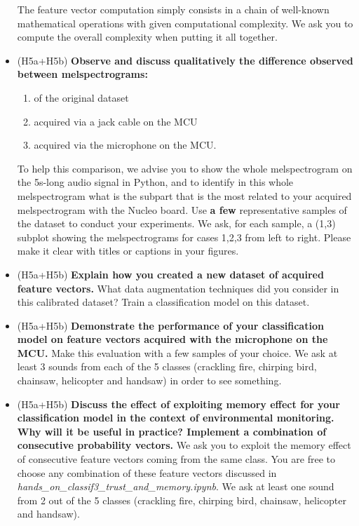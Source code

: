 \begin{itemize}
The feature vector computation simply consists in a chain of well-known mathematical operations with given computational complexity. We ask you to compute the overall complexity when putting it all together.
\item (H5a+H5b) \textbf{Observe and discuss qualitatively the difference observed between melspectrograms:}
\begin{enumerate}
    \item of the original dataset
    \item acquired via a jack cable on the MCU
    \item acquired via the microphone on the MCU.
   \end{enumerate}
   To help this comparison, we advise you to show the whole melspectrogram on the 5s-long audio signal in Python, and to identify in this whole melspectrogram what is the subpart that is the most related to your acquired melspectrogram with the Nucleo board.
     Use \textbf{a few} representative samples of the dataset to conduct your experiments.
       We ask, for each sample, a (1,3) subplot showing the melspectrograms for cases 1,2,3 from left to right. Please make it clear with titles or captions in your figures.
    \item (H5a+H5b) \textbf{Explain how you created a new dataset of acquired feature vectors.} What data augmentation techniques did you consider in this calibrated dataset? Train a classification model on this dataset.
    \item (H5a+H5b) \textbf{Demonstrate the performance of your classification model on feature vectors acquired with the microphone on the MCU.}
    Make this evaluation with a few samples of your choice. We ask at least 3 sounds from each of the 5 classes (crackling fire, chirping bird, chainsaw, helicopter and handsaw) in order to see something.
    \item (H5a+H5b) \textbf{Discuss the effect of exploiting memory effect for your classification model in the context of environmental monitoring. Why will it be useful in practice? Implement a combination of consecutive probability vectors.} We ask you to exploit the memory effect of consecutive feature vectors coming from the same class. You are free to choose any combination of these feature vectors discussed in \emph{hands\_on\_classif3\_trust\_and\_memory.ipynb}. We ask at least one sound from 2 out of the 5 classes (crackling fire, chirping bird, chainsaw, helicopter and handsaw).
\end{itemize}
